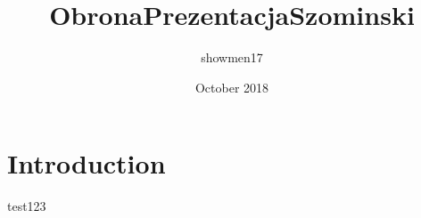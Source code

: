 \documentclass{article}
\title{ObronaPrezentacjaSzominski}
\author{showmen17 }
\date{October 2018}
\begin{document}
\maketitle

\section{Introduction}

test123
\end{document}
